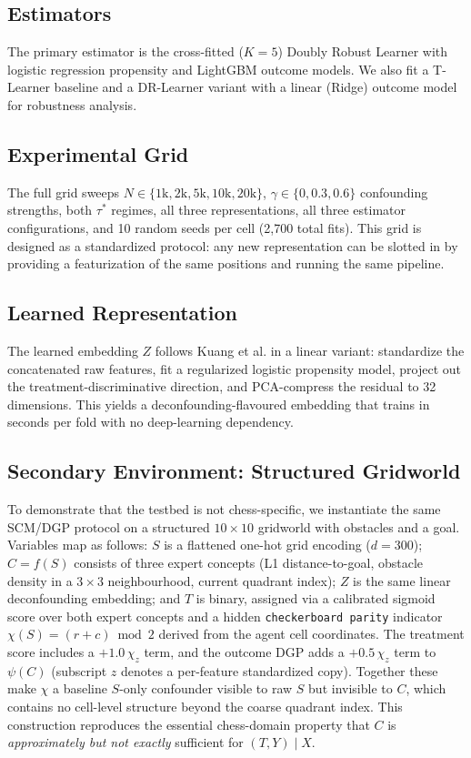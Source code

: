 \documentclass[11pt]{article}
\begin{document}
\subsection*{Estimators}
The primary estimator is the cross-fitted ($K{=}5$) Doubly Robust
Learner\cite{chernozhukov2018double} with logistic regression propensity and
LightGBM outcome models. We also fit a T-Learner baseline and a DR-Learner variant
with a linear (Ridge) outcome model for robustness analysis.

\subsection*{Experimental Grid}
The full grid sweeps $N \in \{1\text{k}, 2\text{k}, 5\text{k}, 10\text{k},
20\text{k}\}$, $\gamma \in \{0, 0.3, 0.6\}$ confounding strengths, both $\tau^*$
regimes, all three representations, all three estimator configurations, and 10
random seeds per cell (2{,}700 total fits). This grid is designed as a standardized
protocol: any new representation can be slotted in by providing a featurization of
the same positions and running the same pipeline.

\subsection*{Learned Representation}
The learned embedding $Z$ follows Kuang et al.\cite{kuang2020information} in a
linear variant: standardize the concatenated raw features, fit a regularized
logistic propensity model, project out the treatment-discriminative direction, and
PCA-compress the residual to 32 dimensions. This yields a deconfounding-flavoured
embedding that trains in seconds per fold with no deep-learning
dependency.\cite{deconfoundingScores}

\subsection*{Secondary Environment: Structured Gridworld}
To demonstrate that the testbed is not chess-specific, we instantiate the same
SCM/DGP protocol on a structured $10 \times 10$ gridworld with obstacles and a
goal. Variables map as follows: $S$ is a flattened one-hot grid encoding ($d = 300$);
$C = f(S)$ consists of three expert concepts (L1 distance-to-goal, obstacle density
in a $3 \times 3$ neighbourhood, current quadrant index); $Z$ is the same linear
deconfounding embedding; and $T$ is binary, assigned via a calibrated sigmoid
score over both expert concepts and a hidden \texttt{checkerboard parity}
indicator $\chi(S) = (r + c) \bmod 2$ derived from the agent cell coordinates.
The treatment score includes a $+1.0\,\chi_z$ term, and the outcome DGP adds a
$+0.5\,\chi_z$ term to $\psi(C)$ (subscript $z$ denotes a per-feature standardized
copy). Together these make $\chi$ a baseline $S$-only confounder visible to raw
$S$ but invisible to $C$, which contains no cell-level structure beyond the
coarse quadrant index. This construction reproduces the essential chess-domain
property that $C$ is \emph{approximately but not exactly} sufficient for $(T,Y)
\mid X$.
\end{document}
